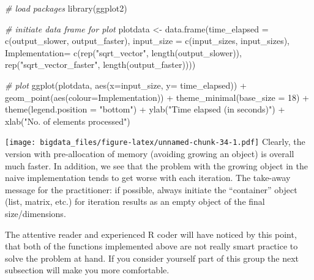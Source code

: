 \documentclass[
  12pt,
]{style/krantz}
\newenvironment{Shaded}{\begin{snugshade}}{\end{snugshade}}
\newcommand{\AttributeTok}[1]{\textcolor[rgb]{0.77,0.63,0.00}{#1}}
\newcommand{\CommentTok}[1]{\textcolor[rgb]{0.56,0.35,0.01}{\textit{#1}}}
\newcommand{\DecValTok}[1]{\textcolor[rgb]{0.00,0.00,0.81}{#1}}
\newcommand{\FunctionTok}[1]{\textcolor[rgb]{0.00,0.00,0.00}{#1}}
\newcommand{\NormalTok}[1]{#1}
\newcommand{\OtherTok}[1]{\textcolor[rgb]{0.56,0.35,0.01}{#1}}
\newcommand{\SpecialCharTok}[1]{\textcolor[rgb]{0.00,0.00,0.00}{#1}}
\newcommand{\StringTok}[1]{\textcolor[rgb]{0.31,0.60,0.02}{#1}}
\begin{document}
\begin{Shaded}
\begin{Highlighting}[]
\CommentTok{\# load packages}
\FunctionTok{library}\NormalTok{(ggplot2)}

\CommentTok{\# initiate data frame for plot}
\NormalTok{plotdata }\OtherTok{\textless{}{-}} \FunctionTok{data.frame}\NormalTok{(}\AttributeTok{time\_elapsed =} \FunctionTok{c}\NormalTok{(output\_slower, output\_faster),}
                       \AttributeTok{input\_size =} \FunctionTok{c}\NormalTok{(input\_sizes, input\_sizes),}
                       \AttributeTok{Implementation=} \FunctionTok{c}\NormalTok{(}\FunctionTok{rep}\NormalTok{(}\StringTok{"sqrt\_vector"}\NormalTok{, }\FunctionTok{length}\NormalTok{(output\_slower)),}
                            \FunctionTok{rep}\NormalTok{(}\StringTok{"sqrt\_vector\_faster"}\NormalTok{, }\FunctionTok{length}\NormalTok{(output\_faster))))}

\CommentTok{\# plot}
\FunctionTok{ggplot}\NormalTok{(plotdata, }\FunctionTok{aes}\NormalTok{(}\AttributeTok{x=}\NormalTok{input\_size, }\AttributeTok{y=}\NormalTok{ time\_elapsed)) }\SpecialCharTok{+}
     \FunctionTok{geom\_point}\NormalTok{(}\FunctionTok{aes}\NormalTok{(}\AttributeTok{colour=}\NormalTok{Implementation)) }\SpecialCharTok{+}
     \FunctionTok{theme\_minimal}\NormalTok{(}\AttributeTok{base\_size =} \DecValTok{18}\NormalTok{) }\SpecialCharTok{+}
     \FunctionTok{theme}\NormalTok{(}\AttributeTok{legend.position =} \StringTok{"bottom"}\NormalTok{) }\SpecialCharTok{+}
     \FunctionTok{ylab}\NormalTok{(}\StringTok{"Time elapsed (in seconds)"}\NormalTok{) }\SpecialCharTok{+}
     \FunctionTok{xlab}\NormalTok{(}\StringTok{"No. of elements processed"}\NormalTok{) }
\end{Highlighting}
\end{Shaded}

\texttt{[image: bigdata\_files/figure-latex/unnamed-chunk-34-1.pdf]}
Clearly, the version with pre-allocation of memory (avoiding growing an object) is overall much faster. In addition, we see that the problem with the growing object in the naive implementation tends to get worse with each iteration. The take-away message for the practitioner: if possible, always initiate the ``container'' object (list, matrix, etc.) for iteration results as an empty object of the final size/dimensions.

The attentive reader and experienced R coder will have noticed by this point, that both of the functions implemented above are not really smart practice to solve the problem at hand. If you consider yourself part of this group the next subsection will make you more comfortable.
\end{document}
